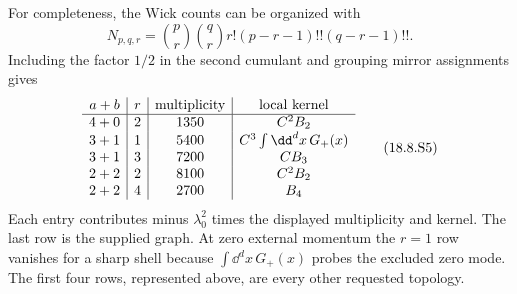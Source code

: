 \begin{enumerate}
\begin{enumerate}
\begin{enumerate}
      For completeness, the Wick counts can be organized with
      \[
        N_{p,q,r}=\binom pr\binom qr r!
          (p-r-1)!!(q-r-1)!! .
      \]
      Including the factor \(1/2\) in the second cumulant and grouping
      mirror assignments gives
      \[
      \begin{array}{c|c|c|c}
        a+b&r&\hbox{multiplicity}&\hbox{local kernel}\\ \hline
        4+0&2&1350&C^2B_2\\
        3+1&1&5400&C^3\int \dd^dx\,G_+(x)\\
        3+1&3&7200&CB_3\\
        2+2&2&8100&C^2B_2\\
        2+2&4&2700&B_4
      \end{array}
      \tag{18.8.S5}
      \]
      Each entry contributes minus
      \(\lambda_0^2\) times the displayed multiplicity and kernel.
      The last row is the supplied graph.  At zero external momentum the
      \(r=1\) row vanishes for a sharp shell because
      \(\int \dd^dx\,G_+(x)\) probes the excluded zero mode.  The first four
      rows, represented above, are every other requested topology.
    \end{enumerate}
  \end{enumerate}


\end{enumerate}

